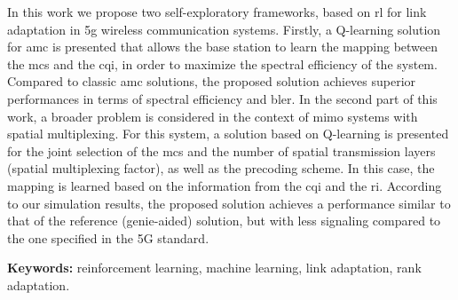 \begin{resumo}

\setlength\parindent{24pt}

In this work we propose two self-exploratory frameworks, based on \gls{rl} for link adaptation in \gls{5g} wireless communication systems.
%
Firstly, a Q-learning solution for \gls{amc} is presented that allows the base station to learn the mapping between the \gls{mcs} and the \gls{cqi}, in order to maximize the spectral efficiency of the system.
%
Compared to classic \gls{amc} solutions, the proposed solution achieves superior performances in terms of spectral efficiency and \gls{bler}.
%
In the second part of this work, a broader problem is considered in the context of \gls{mimo} systems with spatial multiplexing.
%
For this system, a solution based on Q-learning is presented for the joint selection of the \gls{mcs} and the number of spatial transmission layers (spatial multiplexing factor), as well as the precoding scheme.
%
In this case, the mapping is learned based on the information from the \gls{cqi} and the \gls{ri}.
%
According to our simulation results, the proposed solution achieves a performance similar to that of the reference (genie-aided) solution, but with less signaling compared to the one specified in the 5G standard.
%
%

\vspace*{2ex}
\textbf{Keywords: } reinforcement learning, machine learning, link adaptation, rank adaptation.
\end{resumo}
